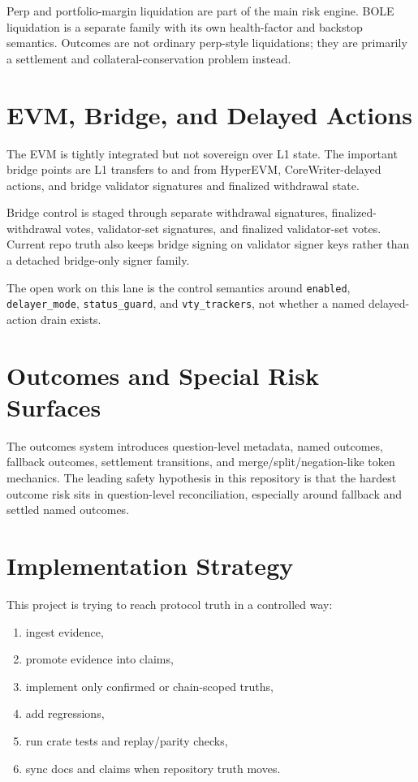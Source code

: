 \documentclass[11pt]{article}
\begin{document}
Perp and portfolio-margin liquidation are part of the main risk engine. BOLE
liquidation is a separate family with its own health-factor and backstop
semantics. Outcomes are not ordinary perp-style liquidations; they are
primarily a settlement and collateral-conservation problem instead.

\section{EVM, Bridge, and Delayed Actions}

The EVM is tightly integrated but not sovereign over L1 state. The important
bridge points are L1 transfers to and from HyperEVM, CoreWriter-delayed
actions, and bridge validator signatures and finalized withdrawal state.

Bridge control is staged through separate withdrawal signatures,
finalized-withdrawal votes, validator-set signatures, and finalized
validator-set votes. Current repo truth also keeps bridge signing on validator
signer keys rather than a detached bridge-only signer family.

The open work on this lane is the control semantics around
\texttt{enabled}, \texttt{delayer\_mode}, \texttt{status\_guard}, and
\texttt{vty\_trackers}, not whether a named delayed-action drain exists.

\section{Outcomes and Special Risk Surfaces}

The outcomes system introduces question-level metadata, named outcomes,
fallback outcomes, settlement transitions, and merge/split/negation-like token
mechanics. The leading safety hypothesis in this repository is that the
hardest outcome risk sits in question-level reconciliation, especially around
fallback and settled named outcomes.

\section{Implementation Strategy}

This project is trying to reach protocol truth in a controlled way:

\begin{enumerate}[leftmargin=1.4em]
  \item ingest evidence,
  \item promote evidence into claims,
  \item implement only confirmed or chain-scoped truths,
  \item add regressions,
  \item run crate tests and replay/parity checks,
  \item sync docs and claims when repository truth moves.
\end{enumerate}
\end{document}
